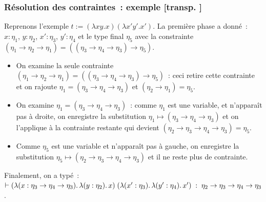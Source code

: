 \documentclass[mathserif,a4paper,aspectratio=169]{beamer}
\renewcommand{\frametitle}[1]{\subsubsection*{#1 {\footnotesize[transp. \insertframenumber]}}}
\begin{document}
\begin{frame}
\frametitle{Résolution des contraintes : exemple}

Reprenons l'exemple $t := (\lambda xy.x) (\lambda x'y'.x')$.  La
première phase a donné : $x:\eta_1$, $y:\eta_2$, $x':\eta_3$,
$y':\eta_4$ et le type final $\eta_5$ avec la constrainte $(\eta_1 \to
\eta_2 \to \eta_1) = ((\eta_3 \to \eta_4 \to \eta_3) \to \eta_5)$.

\smallskip

\begin{itemize}
\item On examine la seule contrainte $(\eta_1 \to \eta_2 \to \eta_1) =
  ((\eta_3 \to \eta_4 \to \eta_3) \to \eta_5)$ : ceci retire cette
  contrainte et on rajoute $\eta_1 = (\eta_3 \to \eta_4 \to \eta_3)$
  et $(\eta_2 \to \eta_1) = \eta_5$.
\item On examine $\eta_1 = (\eta_3 \to \eta_4 \to \eta_3)$ : comme
  $\eta_1$ est une variable, et n'apparaît pas à droite, on enregistre
  la substitution $\eta_1 \mapsto (\eta_3 \to \eta_4 \to \eta_3)$ et
  on l'applique à la contrainte restante qui devient $(\eta_2 \to
  \eta_3 \to \eta_4 \to \eta_3) = \eta_5$.
\item Comme $\eta_5$ est une variable et n'apparaît pas à gauche, on
  enregistre la substitution $\eta_5 \mapsto (\eta_2 \to \eta_3 \to
  \eta_4 \to \eta_3)$ et il ne reste plus de contrainte.
\end{itemize}

\medskip

Finalement, on a typé : $\vdash (\lambda (x:\eta_3 \to \eta_4 \to
\eta_3).\,\lambda(y:\eta_2).\,x) \; (\lambda
(x':\eta_3).\,\lambda(y':\eta_4).\,x') \; : \penalty-1000\; \eta_2 \to
\eta_3 \to \eta_4 \to \eta_3$.

\end{frame}
%
\end{document}
